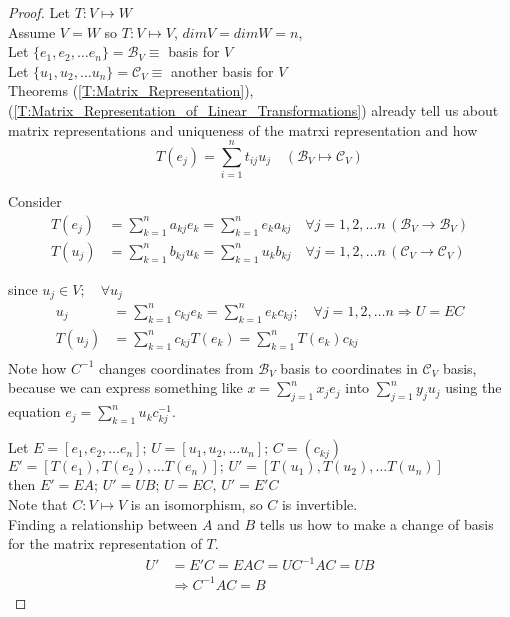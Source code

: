 \documentclass[twoside]{amsart}
\theoremstyle{plain}
\theoremstyle{definition}
\begin{document}
\begin{proof}
Let $T:V \mapsto W$ \\
Assume $V=W$ so $T:V\mapsto V $, $dim V = dim W = n$, \\
\phantom{Ass}Let $\{e_1,e_2,\dots e_n \} = \mathcal{B}_V \equiv$ basis for $V$ \\ 
\phantom{Ass}Let $\{u_1,u_2,\dots u_n \} = \mathcal{C}_V \equiv$ another basis for $V$ \\ 
Theorems (\ref{T:Matrix_Representation}), (\ref{T:Matrix_Representation_of_Linear_Transformations}) already tell us about matrix representations and uniqueness of the matrxi representation and how 
\[
T(e_j) = \sum_{i=1}^n t_{ij} u_j \quad (\mathcal{B}_V \mapsto \mathcal{C}_V)
\]

Consider 
\begin{align*}
T(e_j) &= \sum_{k=1}^n a_{kj}e_k = \sum_{k=1}^n e_k a_{kj} \quad \forall j=1,2,\dots n \, (\mathcal{B}_V \to \mathcal{B}_V) \\
T(u_j) &= \sum_{k=1}^n b_{kj}u_k = \sum_{k=1}^n u_k b_{kj} \quad \forall j=1,2,\dots n \, (\mathcal{C}_V \to \mathcal{C}_V) 
\end{align*}

since $u_j \in V; \quad \forall u_j$
\begin{align*}
u_j & = \sum_{k=1}^n c_{kj} e_k = \sum_{k=1}^n e_k c_{kj}; \quad \forall j = 1,2,\dots n \Longrightarrow U=EC \\
T(u_{j}) &= \sum_{k=1}^n c_{kj} T(e_{k}) = \sum_{k=1}^n T(e_{k})c_{kj} \\
\end{align*}
Note how $C^{-1}$ changes coordinates from $\mathcal{B}_V$ basis to coordinates in $\mathcal{C}_V$ basis, because we can express something like $x = \sum_{j=1}^n x_j e_j$ into $\sum_{j=1}^n y_j u_j$ using the equation $e_j = \sum_{k=1}^n u_k c^{-1}_{kj}$.

Let $E= [e_1,e_2,\dots e_n ]; \, U = [u_1, u_2, \dots u_n ]; \, C = (c_{kj})$ \\
\phantom{Let} $E'= [T(e_1),T(e_2),\dots T(e_n) ]; \, U' = [T(u_1), T(u_2), \dots T(u_n) ]$ \\
\phantom{Le} then $E'=EA; \, U' = UB; \, U=EC, \, U'=E'C $ \\ 

Note that $C:V \mapsto V$ is an isomorphism, so $C$ is invertible.  \\
Finding a relationship between $A$ and $B$ tells us how to make a change of basis for the matrix representation of $T$.  
\begin{align*}
U' &= E'C = EAC = UC^{-1}AC = UB \\
& \Longrightarrow C^{-1}AC = B
\end{align*}
\end{proof}
\end{document}

